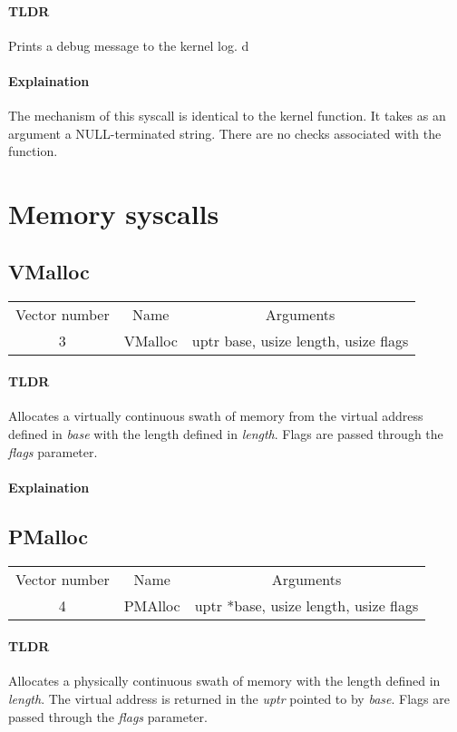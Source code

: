 \documentclass{report}
\begin{document}
\paragraph{TLDR} 
Prints a debug message to the kernel log.
d
\paragraph{Explaination}
The mechanism of this syscall is identical to the kernel function. It takes as an argument a NULL-terminated string. There are no checks associated with the function.

\section{Memory syscalls}

\subsection{VMalloc}
\begin{tabular}{ |c|c|c| }
	Vector number & Name & Arguments \\ 
	3 & VMalloc & uptr base, usize length, usize flags \\
\end{tabular}

\paragraph{TLDR} 
Allocates a virtually continuous swath of memory from the virtual address defined in \textit{base} with the length defined in \textit{length}. Flags are passed through the \textit{flags} parameter.

\paragraph{Explaination}


\subsection{PMalloc}
\begin{tabular}{ |c|c|c| }
	Vector number & Name & Arguments \\ 
	4 & PMAlloc & uptr *base, usize length, usize flags \\
\end{tabular}

\paragraph{TLDR} 
Allocates a physically continuous swath of memory with the length defined in \textit{length}. The virtual address is returned in the \textit{uptr} pointed to by \textit{base}. Flags are passed through the \textit{flags} parameter.
\end{document}
